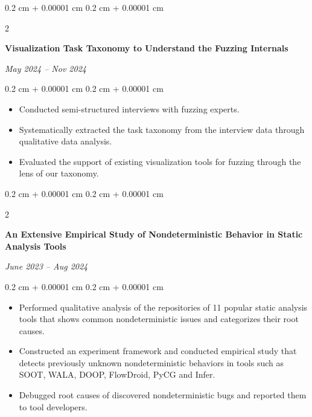 \documentclass[10pt, letterpaper]{article}
\newenvironment{highlights}{
    \begin{itemize}[
        topsep=0.10 cm,
        parsep=0.10 cm,
        partopsep=0pt,
        itemsep=0pt,
        leftmargin=0.4 cm + 10pt
    ]
}{
    \end{itemize}
} %
\newenvironment{onecolentry}{
    \begin{adjustwidth}{
        0.2 cm + 0.00001 cm
    }{
        0.2 cm + 0.00001 cm
    }
}{
    \end{adjustwidth}
} %
\newenvironment{twocolentry}[2][]{
    \onecolentry
    \def\secondColumn{#2}
    \setcolumnwidth{\fill, 4.5 cm}
    \begin{paracol}{2}
}{
    \switchcolumn \raggedleft \secondColumn
    \end{paracol}
    \endonecolentry
} %
\begin{document}
        \vspace{0.2 cm}

        \begin{twocolentry}{
        \textit{May 2024 – Nov 2024}}
            \textbf{Visualization Task Taxonomy to Understand the Fuzzing Internals}
        \end{twocolentry}

        \vspace{0.10 cm}
        \begin{onecolentry}
            \begin{highlights}
            \item Conducted semi-structured interviews with fuzzing experts. 
            \item Systematically extracted the task taxonomy from the interview data through qualitative data analysis. 
            \item Evaluated the support of existing visualization tools for fuzzing through the lens of our taxonomy. 
            \end{highlights}
        \end{onecolentry}


        \vspace{0.2 cm}

        \begin{twocolentry}{
        \textit{June 2023 – Aug 2024}}
            \textbf{An Extensive Empirical Study of Nondeterministic Behavior in Static Analysis Tools}
        \end{twocolentry}

        \vspace{0.10 cm}
        \begin{onecolentry}
            \begin{highlights}

            \item Performed qualitative analysis of the repositories of 11 popular static analysis tools that shows common nondeterministic issues and categorizes their root causes.
            \item Constructed an experiment framework and conducted empirical study that detects previously unknown nondeterministic behaviors in tools such as SOOT, WALA, DOOP, FlowDroid, PyCG and Infer.
            \item Debugged root causes of discovered nondeterministic bugs and reported them to tool developers.
            \end{highlights}
        \end{onecolentry}
\end{document}
